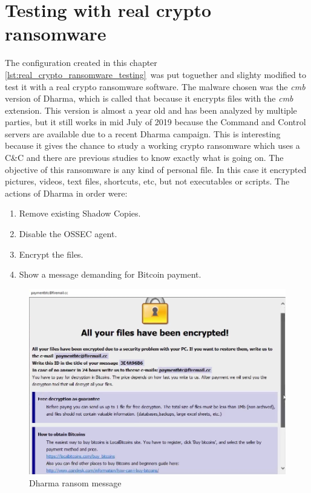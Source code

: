 \section{Testing with real crypto ransomware}
The configuration created in this chapter \ref{lst:real_crypto_ransomware_testing}\ was put toguether and slighty modified to test it with a real crypto ransomware software.
The malware chosen was the \textit{cmb} version of Dharma\cite{dharma}, which is called that because it encrypts files with the \textit{cmb} extension.
\linej
This version is almost a year old and has been analyzed by multiple parties, but it still works in mid July of 2019 because the Command and Control servers are available due to a recent Dharma campaign.
This is interesting because it gives the chance to study a working crypto ransomware which uses a C\&C and there are previous studies to know exactly what is going on.
\linej
\linej
The objective of this ransomware is any kind of personal file.
In this case it encrypted pictures, videos, text files, shortcuts, etc, but not executables or scripts.
The actions of Dharma in order were\cite{dharma}:
\begin{enumerate}
	\item Remove existing Shadow Copies.
	\item Disable the OSSEC agent.
	\item Encrypt the files.
	\item Show a message demanding for Bitcoin payment.
\end{enumerate}
\begin{figure}[H]
	\centering
	\includegraphics[width=.9\textwidth]{figuras/Bitcoin_Dharma.png}
	\caption{Dharma ransom message}
\end{figure}
